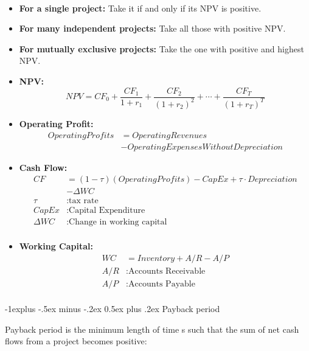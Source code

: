 \documentclass[10pt,landscape,a4paper]{article}
\makeatletter
\renewcommand{\subsection}{\@startsection{subsection}{2}{0mm}%
                                {-1explus -.5ex minus -.2ex}%
                                {0.5ex plus .2ex}%
                                {\normalfont\normalsize\bfseries}}
\makeatother
\begin{document}
\begin{multicols*}{3}
\begin{description}[itemsep=0pt]
	\item[Investment Criteria for NPV and cash flow calculations]  ~
	\begin{itemize}
		\item {\bf For a single project:} Take it if and only if its NPV is positive.
		\item {\bf For many independent projects:}  Take all those with positive NPV.
		\item {\bf For mutually exclusive projects:}  Take the one with positive and highest NPV.
		\item {\bf NPV:} $$ NPV = CF_0 + \frac{CF_1}{1+r_1}+\frac{CF_2}{(1+r_2)^2} + \cdots + \frac{CF_T}{(1+r_T)^T} $$
		\item {\bf Operating Profit:}
			 \begin{align*}
			 	 OperatingProfits &=  OperatingRevenues \\
			 	                  &- OperatingExpensesWithoutDepreciation
		 	 \end{align*}
		\item {\bf Cash Flow:} 
			\begin{align*}
				 CF &= (1-\tau) (OperatingProfits) - CapEx + \tau \cdot Depreciation \\
				  &-\Delta WC \\
				 \tau &: \text{tax rate} \\
				 CapEx &: \text{Capital Expenditure} \\
				 \Delta WC &: \text{Change in working capital} \\
			\end{align*}	
		\item {\bf Working Capital:} 
			\begin{align*}
				WC &= Inventory + A/R - A/P \\
				A/R &: \text{Accounts Receivable} \\
				A/P &: \text{Accounts Payable} \\
			\end{align*}					
	\end{itemize}
\end{description}



\subsection{Payback period}

Payback period is the minimum length of time s such that the sum of net cash flows from a project becomes positive:


\end{multicols*}
\end{document}
